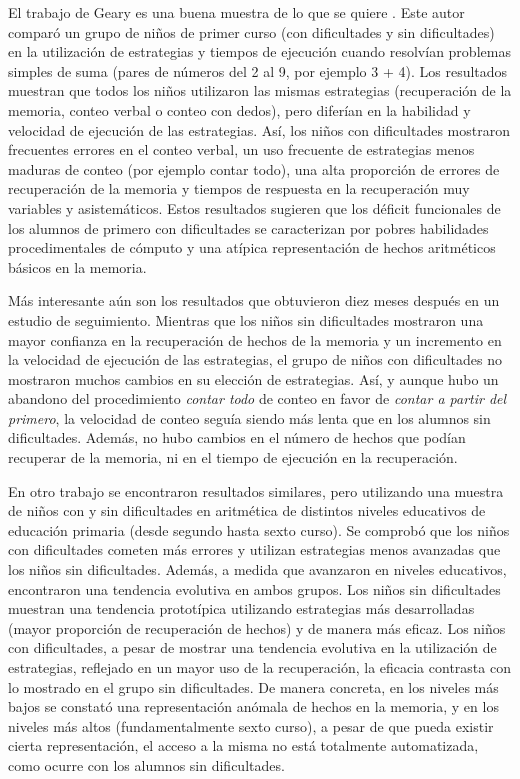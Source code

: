 \documentclass{article}
\begin{document}
El trabajo de Geary es una buena muestra de lo que se quiere \cite{geary1991cognitive, geary1999numerical}. Este autor comparó un grupo de niños de primer curso (con dificultades y sin dificultades) en la utilización de estrategias y tiempos de ejecución cuando resolvían problemas simples de suma (pares de números del 2 al 9, por ejemplo 3 + 4). Los resultados muestran que todos los niños utilizaron las mismas estrategias (recuperación de la memoria, conteo verbal o conteo con dedos), pero diferían en la habilidad y velocidad de ejecución de las estrategias. Así, los niños con dificultades mostraron frecuentes errores en el conteo verbal, un uso frecuente de estrategias menos maduras de conteo (por ejemplo contar todo), una alta proporción de errores de recuperación de la memoria y tiempos de respuesta en la recuperación muy variables y asistemáticos. Estos resultados sugieren que los déficit funcionales de los alumnos de primero con dificultades se caracterizan por pobres habilidades procedimentales de cómputo y una atípica representación de hechos aritméticos básicos en la memoria.

Más interesante aún son los resultados que obtuvieron diez meses después en un estudio de seguimiento. Mientras que los niños sin dificultades mostraron una mayor confianza en la recuperación de hechos de la memoria y un incremento en la velocidad de ejecución de las estrategias, el grupo de niños con dificultades no mostraron muchos cambios en su elección de estrategias. Así, y aunque hubo un abandono del procedimiento \emph{contar todo} de conteo en favor de \emph{contar a partir del primero}, la velocidad de conteo seguía siendo más lenta que en los alumnos sin dificultades. Además, no hubo cambios en el número de hechos que podían recuperar de la memoria, ni en el tiempo de ejecución en la recuperación.

En otro trabajo se encontraron resultados similares, pero utilizando una muestra de niños con y sin dificultades en aritmética de distintos niveles educativos de educación primaria (desde segundo hasta sexto curso). Se comprobó que los niños con dificultades cometen más errores y utilizan estrategias menos avanzadas que los niños sin dificultades. Además, a medida que avanzaron en niveles educativos, encontraron una tendencia evolutiva en ambos grupos. Los niños sin dificultades muestran una tendencia prototípica utilizando estrategias más desarrolladas (mayor proporción de recuperación de hechos) y de manera más eficaz. Los niños con dificultades, a pesar de mostrar una tendencia evolutiva en la utilización de estrategias, reflejado en un mayor uso de la recuperación, la eficacia contrasta con lo mostrado en el grupo sin dificultades. De manera concreta, en los niveles más bajos se constató una representación anómala de hechos en la memoria, y en los niveles más altos (fundamentalmente sexto curso), a pesar de que pueda existir cierta representación, el acceso a la misma no está totalmente automatizada, como ocurre con los alumnos sin dificultades.
\end{document}
